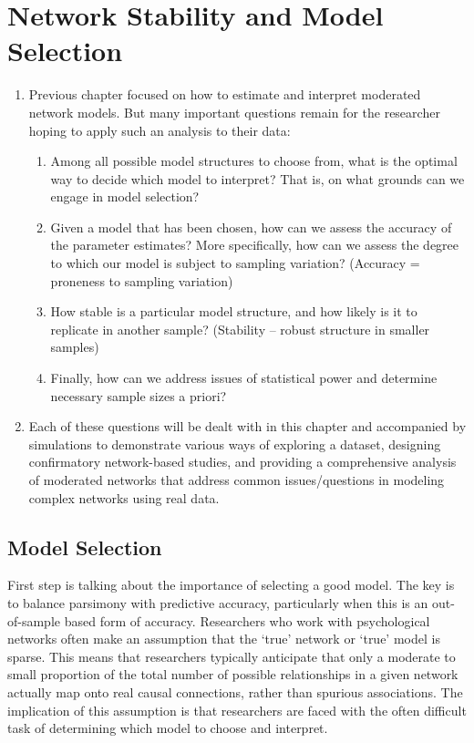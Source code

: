 \chapter{Network Stability and Model Selection}

\begin{enumerate}
    \item Previous chapter focused on how to estimate and interpret moderated network models. But many important questions remain for the researcher hoping to apply such an analysis to their data:
    \begin{enumerate}
        \item Among all possible model structures to choose from, what is the optimal way to decide which model to interpret? That is, on what grounds can we engage in model selection?
        \item Given a model that has been chosen, how can we assess the accuracy of the parameter estimates? More specifically, how can we assess the degree to which our model is subject to sampling variation? (Accuracy = proneness to sampling variation)
        \item How stable is a particular model structure, and how likely is it to replicate in another sample? (Stability -- robust structure in smaller samples)
        \item Finally, how can we address issues of statistical power and determine necessary sample sizes a priori?
    \end{enumerate}
    \item Each of these questions will be dealt with in this chapter and accompanied by simulations to demonstrate various ways of exploring a dataset, designing confirmatory network-based studies, and providing a comprehensive analysis of moderated networks that address common issues/questions in modeling complex networks using real data.
\end{enumerate}

\section{Model Selection}
First step is talking about the importance of selecting a good model. The key is to balance parsimony with predictive accuracy, particularly when this is an out-of-sample based form of accuracy. Researchers who work with psychological networks often make an assumption that the `true' network or `true' model is sparse. This means that researchers typically anticipate that only a moderate to small proportion of the total number of possible relationships in a given network actually map onto real causal connections, rather than spurious associations. The implication of this assumption is that researchers are faced with the often difficult task of determining which model to choose and interpret.

